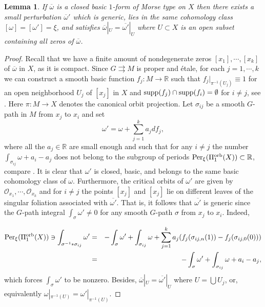 \documentclass[
  a4paper, 
  reqno, 
  oneside, 
  12pt
]{amsart}
\newtheorem{lemma}[theorem]{Lemma}
\theoremstyle{definition}
\theoremstyle{remark}
\newcommand{\rr}{\rightrightarrows}
\begin{document}
\begin{lemma}\label{lem:generic}
If $\overline{\omega}$ is a closed basic $1$-form of Morse type on $X$ then there exists a small perturbation $\overline{\omega}'$ which is generic, lies in the same cohomology class $[\omega]=[\omega']=\xi$, and satisfies $\overline{\omega}|_{U}=\overline{\omega'}|_{U}$ where $U\subset X$ is an open subset containing all zeros of $\overline{\omega}$.
\end{lemma}
\begin{proof}
Recall that we have a finite amount of nondegenerate zeros $[x_1],\cdots,[x_k]$ of $\overline{\omega}$ in $X$, as it is compact. Since $G\rr M$ is proper and étale, for each $j=1,\cdots,k$ we can construct a smooth basic function $f_j:M\to \mathbb{R}$ such that $f_j|_{\pi^{-1}(U_j)}\equiv 1$ for an open neighborhood $U_j$ of $[x_j]$ in $X$ and $\textnormal{supp}(f_j)\cap \textnormal{supp}(f_i)=\emptyset$ for $i\neq j$, see \cite[s. 3.1]{CM}. Here $\pi:M\to X$ denotes the canonical orbit projection. Let $\sigma_{ij}$ be a smooth $G$-path in $M$ from $x_j$ to $x_i$ and set
$$\omega'=\omega+\sum_{j=1}^{k}a_jdf_j,$$
where all the $a_j\in \mathbb{R}$ are small enough and such that for any $i\ne j$ the number $\int_{\sigma_{ij}}\omega +a_i-a_j$ does not belong to the subgroup of periods $\textnormal{Per}_\xi(\Pi_1^\textnormal{orb}(X)) \subset \mathbb{R}$, compare \cite[s. 3.1]{V}. It is clear that $\omega'$ is closed, basic, and belongs to the same basic cohomology class of $\omega$. Furthermore, the critical orbits of $\omega'$ are given by $\mathcal{O}_{x_1},\cdots, \mathcal{O}_{x_k}$ and for $i\neq j$ the points $[x_j]$ and $[x_j]$ lie on different leaves of the singular foliation associated with $\overline{\omega'}$. That is, it follows that $\overline{\omega'}$ is generic since the $G$-path integral $\int_{\sigma}\omega'\neq 0$ for any smooth $G$-path $\sigma$ from $x_j$ to $x_i$. Indeed,

\begin{eqnarray*}
\textnormal{Per}_\xi(\Pi_1^\textnormal{orb}(X))\ni\int_{\sigma^{-1}\ast \sigma_{ij}}\omega'&=&-\int_{\sigma}\omega'+\int_{\sigma_{ij}}\omega+\sum_{j=1}^{k}a_j(f_j(\sigma_{ij,n}(1))-f_j(\sigma_{ij,0}(0)))\\
&=& -\int_{\sigma}\omega'+\int_{\sigma_{ij}}\omega+a_i-a_j,
\end{eqnarray*}
which forces $\int_{\sigma}\omega'$ to be nonzero. Besides, $\overline{\omega}|_{U}=\overline{\omega'}|_{U}$ where $U=\bigcup U_j$, or, equivalently $\omega|_{\pi^{-1}(U)}=\omega'|_{\pi^{-1}(U)}$. 
\end{proof}
\end{document}

